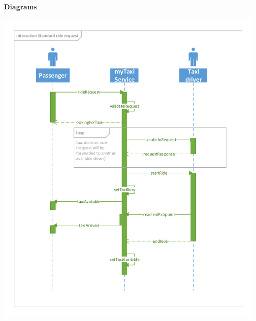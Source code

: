 \paragraph{Diagrams}
\begin{center}
	\includegraphics[height=\textwidth]{diagrams/standard_request}
\end{center}
